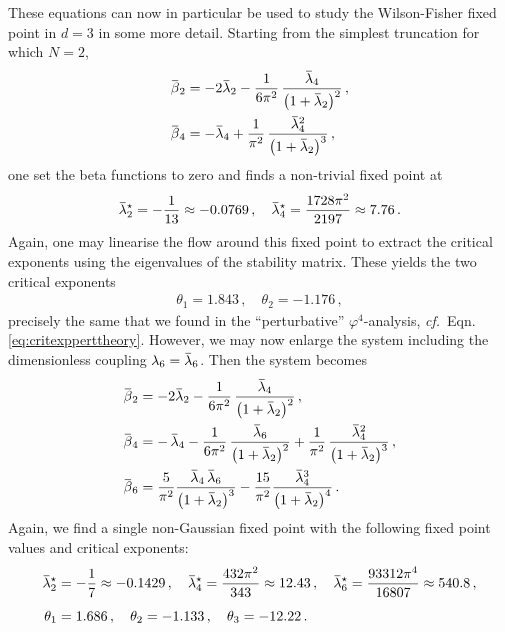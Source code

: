 \documentclass[11pt]{book}
\newcommand{\overbar}[1]{\mkern 1.5mu\overline{\mkern-1.5mu#1\mkern-1.5mu}\mkern 1.5mu}
\newcommand\cf{\textit{cf.}\ }
\numberwithin{equation}{chapter}
\begin{document}
These equations can now in particular be used to study the Wilson-Fisher fixed point
in $d=3$ in some more detail. Starting from the simplest truncation
for which $N=2$,
\begin{align}
  \overbar \beta_2 &=
  -2 \overbar \lambda_2 - \frac{1}{6\pi^2} \, \frac{ \overbar \lambda_4 }{ \big( 1 + \overbar \lambda_2 \big)^2 } \,, \\
  \overbar \beta_4 &=
  - \overbar \lambda_4
  + \frac{1}{\pi^2} \, \frac{ \overbar \lambda_4^2 }{ \big( 1 + \overbar \lambda_2 \big)^3 } \,,
\end{align}
one set the beta functions to zero and finds a non-trivial fixed point at
\begin{align}
  \overbar \lambda_2^\star = - \frac{ 1 }{ 13 } \approx -0.0769 \,,
  \quad
  \overbar \lambda_4^\star = \frac{ 1728 \pi^2 }{ 2197 } \approx 7.76 \,.
\end{align}
Again, one may linearise the flow around this fixed point to extract the critical
exponents using the eigenvalues of the stability matrix. These yields the two
critical exponents
\begin{align}
  \theta_1 = 1.843 \,,
  \quad
  \theta_2 = - 1.176 \,,
\end{align}
precisely the same that we found in the
``perturbative'' $\varphi^4$-analysis, \cf Eqn.\eqref{eq:critexpperttheory}.
However, we may now enlarge the system including the
dimensionless coupling $\lambda_6 = \overbar \lambda_6$. Then the system becomes
\begin{align}
  \overbar \beta_2 &=
  -2 \overbar \lambda_2 - \frac{1}{6\pi^2} \, \frac{ \overbar \lambda_4 }{ \big( 1 + \overbar \lambda_2 \big)^2 } \,, \\
  \overbar \beta_4 &=
  - \, \overbar \lambda_4
  - \frac{1}{6\pi^2} \, \frac{ \overbar \lambda_6 }{ \big( 1 + \overbar \lambda_2 \big)^2 }
  + \frac{1}{\pi^2} \, \frac{ \overbar \lambda_4^2 }{ \big( 1 + \overbar \lambda_2 \big)^3 } \,, \\
  \overbar \beta_6 &=
    \frac{5}{\pi^2} \frac{ \overbar \lambda_4 \, \overbar \lambda_6 }{ \big( 1 + \overbar \lambda_2 \big)^3 }
  - \frac{15}{\pi^2} \frac{ \overbar \lambda_4^3 }{ \big( 1 + \overbar \lambda_2 \big)^4 } \,.
\end{align}
Again, we find a single non-Gaussian fixed point with the following
fixed point values and critical exponents:
\begin{align}
  \overbar \lambda_2^\star &= - \frac{ 1 }{ 7 } \approx -0.1429 \,,
  \quad
  \overbar \lambda_4^\star = \frac{ 432 \pi^2 }{ 343 } \approx 12.43 \,,
  \quad
  \overbar \lambda_6^\star = \frac{ 93312 \pi^4 }{ 16807 } \approx 540.8 \,, \\
  \vphantom{ \frac 17 }
  \theta_1 &= 1.686 \,,
  \quad
  \theta_2 = - 1.133 \,,
  \quad
  \theta_3 = - 12.22 \,.
\end{align}
\end{document}

